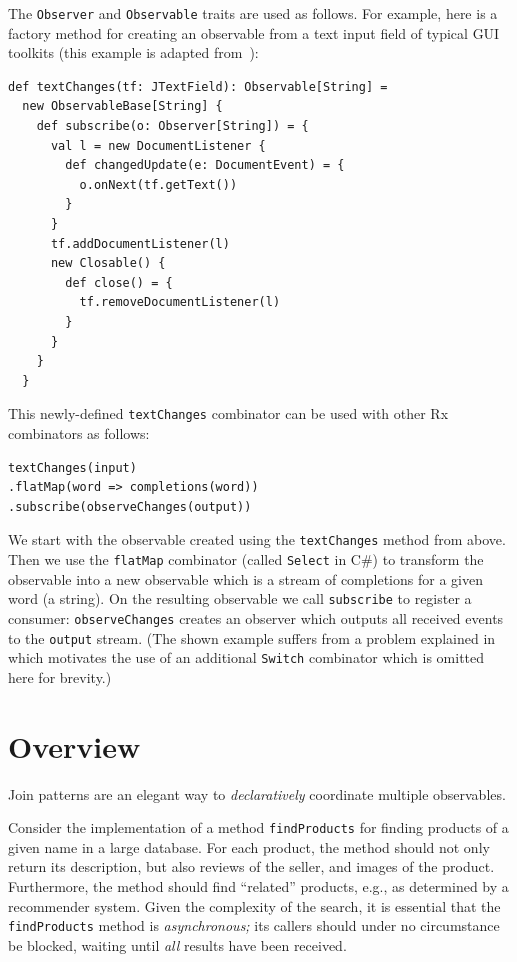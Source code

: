 \documentclass[runningheads]{llncs}
\begin{document}
\begin{sloppypar}
The \verb|Observer| and \verb|Observable| traits are used as follows. For
example, here is a factory method for creating an observable from a text input
field of typical GUI toolkits (this example is adapted from~\cite{RxCACM}):

\lstset{numbers=none,xleftmargin=0em}
\begin{lstlisting}
def textChanges(tf: JTextField): Observable[String] =
  new ObservableBase[String] {
    def subscribe(o: Observer[String]) = {
      val l = new DocumentListener {
        def changedUpdate(e: DocumentEvent) = {
          o.onNext(tf.getText())
        }
      }
      tf.addDocumentListener(l)
      new Closable() {
        def close() = {
          tf.removeDocumentListener(l)
        }
      }
    }
  }
\end{lstlisting}

This newly-defined \verb|textChanges| combinator can be used with other Rx
combinators as follows:

\begin{lstlisting}
textChanges(input)
.flatMap(word => completions(word))
.subscribe(observeChanges(output))
\end{lstlisting}

We start with the observable created using the \verb|textChanges| method from
above. Then we use the \verb|flatMap| combinator (called \verb|Select| in C\#)
to transform the observable into a new observable which is a stream of
completions for a given word (a string). On the resulting observable we call
\verb|subscribe| to register a consumer: \verb|observeChanges| creates an
observer which outputs all received events to the \verb|output| stream. (The
shown example suffers from a problem explained in~\cite{RxCACM} which
motivates the use of an additional \verb|Switch| combinator which is omitted
here for brevity.)

\section{Overview}

Join patterns are an elegant way to {\em declaratively} coordinate multiple
observables.

Consider the implementation of a method \verb|findProducts| for finding
products of a given name in a large database. For each product, the method
should not only return its description, but also reviews of the seller, and
images of the product. Furthermore, the method should find ``related''
products, e.g., as determined by a recommender system. Given the complexity of
the search, it is essential that the \verb|findProducts| method is {\em
asynchronous;} its callers should under no circumstance be blocked, waiting
until {\em all} results have been received.


\end{sloppypar}
\end{document}
